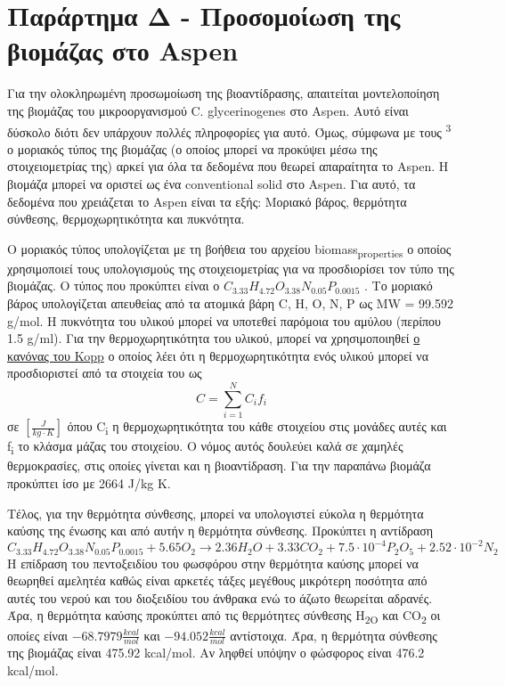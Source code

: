 \documentclass[11pt]{article}
\makeatletter
\newcommand{\citeprocitem}[2]{\hyper@linkstart{cite}{citeproc_bib_item_#1}#2\hyper@linkend}
\makeatother
\begin{document}
\section{Παράρτημα Δ - Προσομοίωση της βιομάζας στο Aspen}
\label{sec:orgc13ffaa}
Για την ολοκληρωμένη προσωμοίωση της βιοαντίδρασης, απαιτείται μοντελοποίηση της βιομάζας του μικροοργανισμού C. glycerinogenes στο Aspen. Αυτό είναι δύσκολο διότι δεν υπάρχουν πολλές πληροφορίες για αυτό. Όμως, σύμφωνα με τους \textsuperscript{\citeprocitem{3}{3}} ο μοριακός τύπος της βιομάζας (ο οποίος μπορεί να προκύψει μέσω της στοιχειομετρίας της) αρκεί για όλα τα δεδομένα που θεωρεί απαραίτητα το Aspen. Η βιομάζα μπορεί να οριστεί ως ένα conventional solid στο Aspen. Για αυτό, τα δεδομένα που χρειάζεται το Aspen είναι τα εξής: Μοριακό βάρος, θερμότητα σύνθεσης, θερμοχωρητικότητα και πυκνότητα.

Ο μοριακός τύπος υπολογίζεται με τη βοήθεια του αρχείου biomass\textsubscript{properties} ο οποίος χρησιμοποιεί τους υπολογισμούς της στοιχειομετρίας για να προσδιορίσει τον τύπο της βιομάζας. Ο τύπος που προκύπτει είναι ο \(C_{3.33}H_{4.72}O_{3.38}N_{0.05}P_{0.0015}\) . Το μοριακό βάρος υπολογίζεται απευθείας από τα ατομικά βάρη C, H, O, N, P ως MW = 99.592 g/mol. Η πυκνότητα του υλικού μπορεί να υποτεθεί παρόμοια του αμύλου (περίπου 1.5 g/ml). Για την θερμοχωρητικότητα του υλικού, μπορεί να χρησιμοποιηθεί \href{https://en.wikipedia.org/wiki/Kopp\%27s\_law}{ο κανόνας του Kopp} ο οποίος λέει ότι η θερμοχωρητικότητα ενός υλικού μπορεί να προσδιοριστεί από τα στοιχεία του ως \[ C = \sum_{i=1}^{N} C_{i}f_i \] σε \(\left[ \frac{J}{kg \cdot K} \right]\) όπου C\textsubscript{i} η θερμοχωρητικότητα του κάθε στοιχείου στις μονάδες αυτές και f\textsubscript{i} το κλάσμα μάζας του στοιχείου. Ο νόμος αυτός δουλεύει καλά σε χαμηλές θερμοκρασίες, στις οποίες γίνεται και η βιοαντίδραση. Για την παραπάνω βιομάζα προκύπτει ίσο με 2664 J/kg K.

Τέλος, για την θερμότητα σύνθεσης, μπορεί να υπολογιστεί εύκολα η θερμότητα καύσης της ένωσης και από αυτήν η θερμότητα σύνθεσης.
Προκύπτει η αντίδραση
\[  C_{3.33}H_{4.72}O_{3.38}N_{0.05}P_{0.0015} + 5.65 O_2 \rightarrow 2.36H_2O + 3.33CO_2+7.5 \cdot 10^{-4} P_2O_5 + 2.52 \cdot 10^{-2} N_2 \]
Η επίδραση του πεντοξειδίου του φωσφόρου στην θερμότητα καύσης μπορεί να θεωρηθεί αμελητέα καθώς είναι αρκετές τάξες μεγέθους μικρότερη ποσότητα από αυτές του νερού και του διοξειδίου του άνθρακα ενώ το άζωτο θεωρείται αδρανές. Άρα, η θερμότητα καύσης προκύπτει από τις θερμότητες σύνθεσης H\textsubscript{2O} και CO\textsubscript{2} οι οποίες είναι \(-68.7979 \frac{kcal}{mol}\) και \(-94.052 \frac{kcal}{mol}\) αντίστοιχα. Άρα, η θερμότητα σύνθεσης της βιομάζας είναι 475.92 kcal/mol. Αν ληφθεί υπόψην ο φώσφορος είναι 476.2 kcal/mol.
\end{document}
